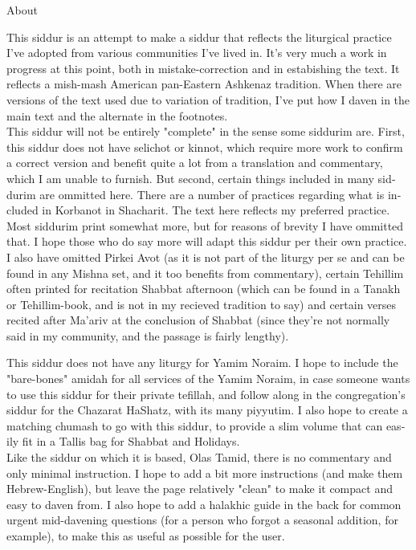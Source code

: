 \documentclass[twoside, openany, parskip=half, 11pt]{book}
\begin{document}
\begin{minipage}{\textwidth}

\begin{english}
\begin{center} %
\begin{LARGE}
About
\end{LARGE}
\end{center}

This siddur is an attempt to make a siddur that reflects the liturgical practice I've adopted from various communities I've lived in. It's very much a work in progress at this point, both in mistake-correction and in estabishing the text. It reflects a mish-mash American pan-Eastern Ashkenaz tradition. When there are versions of the text used due to variation of tradition, I've put how I daven in the main text and the alternate in the footnotes.\\

This siddur will not be entirely "complete" in the sense some siddurim are. First, this siddur does not have selichot or kinnot, which require more work to confirm a correct version and benefit quite a lot from a translation and commentary, which I am unable to furnish. But second, certain things included in many siddurim are ommitted here. There are a number of practices regarding what is included in Korbanot in Shacharit. The text here reflects my preferred practice. Most siddurim print somewhat more, but for reasons of brevity I have ommitted that. I hope those who do say more will adapt this siddur per their own practice. I also have omitted Pirkei Avot (as it is not part of the liturgy per se and can be found in any Mishna set, and it too benefits from commentary), certain Tehillim often printed for recitation Shabbat afternoon (which can be found in a Tanakh or Tehillim-book, and is not in my recieved tradition to say) and certain verses recited after Ma'ariv at the conclusion of Shabbat (since they're not normally said in my community, and the passage is fairly lengthy).

This siddur does not have any liturgy for Yamim Noraim. I hope to include the "bare-bones" amidah for all services of the Yamim Noraim, in case someone wants to use this siddur for their private tefillah, and follow along in the congregation's siddur for the Chazarat HaShatz, with its many piyyutim. I also hope to create a matching chumash to go with this siddur, to provide a slim volume that can easily fit in a Tallis bag for Shabbat and Holidays.\\

Like the siddur on which it is based, Olas Tamid, there is no commentary and only minimal instruction. I hope to add a bit more instructions (and make them Hebrew-English), but leave the page relatively "clean" to make it compact and easy to daven from. I also hope to add a halakhic guide in the back for common urgent mid-davening questions (for a person who forgot a seasonal addition, for example), to make this as useful as possible for the user.


\end{english}

\end{minipage}
\end{document}
